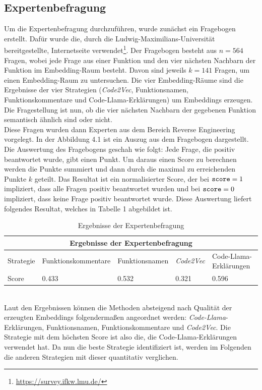 \documentclass[12pt,letterpaper,ngerman]{article}
\begin{document}
\subsection{Expertenbefragung}
Um die Expertenbefragung durchzuführen, wurde zunächst ein
Fragebogen erstellt. Dafür wurde die, durch die 
Ludwig-Maximilians-Universität bereitgestellte, Internetseite
verwendet\footnote{\url{https://survey.ifkw.lmu.de/}}. Der 
Fragebogen besteht aus $n=564 $ Fragen, wobei jede Frage aus
einer Funktion und den vier nächsten Nachbarn der Funktion im
Embedding-Raum besteht. Davon sind jeweils $k = 141$ Fragen, um
einen Embedding-Raum zu untersuchen. Die vier Embedding-Räume
sind die Ergebnisse der vier Strategien (\textit{Code2Vec}, Funktionsnamen,
Funktionskommentare und Code-Llama-Erklärungen) um Embeddings
erzeugen. Die Fragestellung ist nun, ob die vier nächsten Nachbarn 
der gegebenen Funktion semantisch ähnlich sind oder nicht.\\
Diese Fragen wurden dann Experten aus dem Bereich Reverse 
Engineering vorgelegt. In der Abbildung 4.1 ist ein Auszug aus 
dem Fragebogen dargestellt.\\
Die Auswertung des Fragebogens geschah wie folgt: Jede Frage,
die positiv beantwortet wurde, gibt einen Punkt. Um daraus 
einen Score zu berechnen werden die Punkte
summiert und dann durch die  maximal zu
erreichenden Punkte $k$ geteilt. Das Resultat ist ein normalisierter 
Score, der bei $\verb|score| = 1$ impliziert, dass alle Fragen 
positiv beantwortet wurden und bei $\verb|score| = 0$ impliziert, 
dass keine Frage positiv beantwortet wurde. Diese 
Auswertung liefert folgendes Resultat, welches in Tabelle 1
abgebildet ist.
\begin{table}
  \begin{center}
    \begin{tabular}{ |p{1.3cm}||p{3.8cm}|p{3cm}|p{1.8cm}|p{4.5cm}|  }
    \hline
    \multicolumn{5}{|c|}{Ergebnisse der Expertenbefragung} \\
    \hline
    Strategie & Funktionskommentare &  Funktionsnamen & \textit{Code2Vec} & Code-Llama-Erklärungen\\
    \hline
    Score   & 0.433 & 0.532 & 0.321 & 0.596 \\
    \hline
    \end{tabular}
  \end{center} 
  \caption{Ergebnisse der Expertenbefragung}
\end{table}
\hfill\\
Laut den Ergebnissen können die Methoden absteigend 
nach Qualität der erzeugten Embeddings folgendermaßen
angeordnet werden: \textit{Code-Llama}-Erklärungen, 
Funktionsnamen, Funktionskommentare und \textit{Code2Vec}.
Die Strategie mit dem höchsten Score ist also die,
die Code-Llama-Erklärungen
verwendet hat. Da nun die beste Strategie identifiziert ist, 
werden im Folgenden die anderen Strategien mit dieser quantitativ verglichen.
\pagebreak
\end{document}
